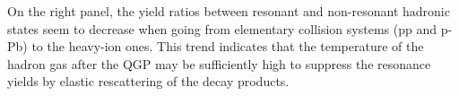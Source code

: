 On the right panel, the yield ratios between resonant and non-resonant hadronic states seem to decrease when going from elementary collision systems (pp and p-Pb) to the heavy-ion ones. This trend indicates that the temperature of the hadron gas after the QGP may be sufficiently high to suppress the resonance yields by elastic rescattering of the decay products.


